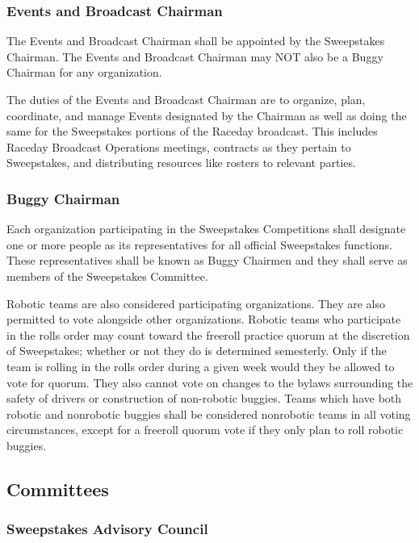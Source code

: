 \subsubsection{Events and Broadcast Chairman}

	The Events and Broadcast Chairman shall be appointed by the Sweepstakes Chairman. The Events and Broadcast Chairman may NOT also be a Buggy Chairman for any organization.

	The duties of the Events and Broadcast Chairman are to organize, plan, coordinate, and manage Events designated by the Chairman as well as doing the same for the Sweepstakes portions of the Raceday broadcast. This includes Raceday Broadcast Operations meetings, contracts as they pertain to Sweepstakes, and distributing resources like rosters to relevant parties.

\subsubsection{Buggy Chairman}

	Each organization participating in the Sweepstakes Competitions shall designate one or more people as its representatives for all official Sweepstakes functions. These representatives shall be known as Buggy Chairmen and they shall serve as members of the Sweepstakes Committee.

	Robotic teams are also considered participating organizations. They are also permitted to vote alongside other organizations. Robotic teams who participate in the rolls order may count toward the freeroll practice quorum at the discretion of Sweepstakes; whether or not they do is determined semesterly. Only if the team is rolling in the rolls order during a given week would they be allowed to vote for quorum. They also cannot vote on changes to the bylaws surrounding the safety of drivers or construction of non-robotic buggies. Teams which have both robotic and nonrobotic buggies shall be considered nonrobotic teams in all voting circumstances, except for a freeroll quorum vote if they only plan to roll robotic buggies.

\subsection{Committees}

\subsubsection{Sweepstakes Advisory Council}

